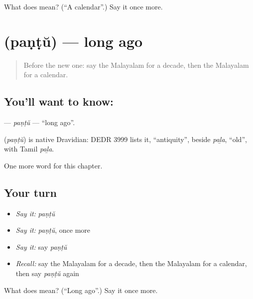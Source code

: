 \begin{tcolorbox}[breakable,colback=teal!4,colframe=teal!35!black,title={Before you move on}]
What does  mean? (\textquotedblleft{}A calendar\textquotedblright{}.) Say it once more.
\end{tcolorbox}
\section[\texorpdfstring{\ml{പണ്ട്} (paṇṭŭ)}{പണ്ട് (paṇṭŭ)}]{ (paṇṭŭ) — long ago}

\label{lesson:ML-C314-pantu2}



\begin{quote}
Before the new one: say the Malayalam for a decade, then the Malayalam for a calendar.
\end{quote}

\subsection*{You'll want to know: }
\textbf{} — \emph{paṇṭŭ} — \textquotedblleft{}long ago\textquotedblright{}.

\begin{cousinweb}
\textbf{} (\emph{paṇṭŭ}) is native Dravidian: DEDR 3999 lists it, \textquotedblleft{}antiquity\textquotedblright{}, beside \emph{paḻa}, \textquotedblleft{}old\textquotedblright{}, with Tamil \emph{paḻa}.
\end{cousinweb}

\begin{grammarlens}[title={What you've built}]
One more word for this chapter.
\end{grammarlens}

\subsection*{Your turn}
\begin{itemize}
\raggedright
  \item \emph{Say it:} \emph{paṇṭŭ}
  \item \emph{Say it:} \emph{paṇṭŭ}, once more
  \item \emph{Say it:} say \emph{paṇṭŭ}
  \item \emph{Recall:} say the Malayalam for a decade, then the Malayalam for a calendar, then say \emph{paṇṭŭ} again
\end{itemize}

\begin{tcolorbox}[breakable,colback=teal!4,colframe=teal!35!black,title={Before you move on}]
What does  mean? (\textquotedblleft{}Long ago\textquotedblright{}.) Say it once more.
\end{tcolorbox}
